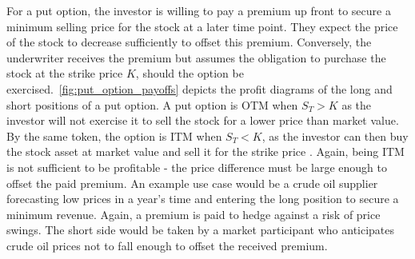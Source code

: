 \documentclass[english,12pt,a4paper,pdftex,sci,utf8]{aaltothesis}
\begin{document}
For a put option, the investor is willing to pay a premium up front to secure a minimum selling price for the stock at a later time point. They expect the price of the stock to decrease sufficiently to offset this premium. Conversely, the underwriter receives the premium but assumes the obligation to purchase the stock at the strike price $K$, should the option be exercised.~\cref{fig:put_option_payoffs} depicts the profit diagrams of the long and short positions of a put option. A put option is OTM when $S_T > K$ as the investor will not exercise it to sell the stock for a lower price than market value. By the same token, the option is ITM when  $S_T < K$, as the investor can then buy the stock asset at market value and sell it for the strike price \cite{hull2013fundamentals}. Again, being ITM is not sufficient to be profitable - the price difference must be large enough to offset the paid premium. An example use case would be a crude oil supplier forecasting low prices in a year's time and entering the long position to secure a minimum revenue. Again, a premium is paid to hedge against a risk of price swings. The short side would be taken by a market participant who anticipates crude oil prices not to fall enough to offset the received premium.
\end{document}
